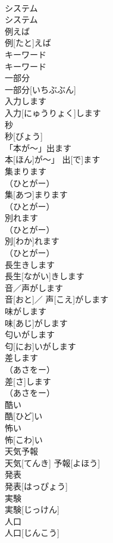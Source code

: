 \documentclass[8pt]{extreport}
\begin{document}
\begin{CJK}{UTF8}{min}
\\	システム	
\\	システム	
\\	例えば	
\\	例[たと]えば	
\\	キーワード	
\\	キーワード	
\\	一部分	
\\	一部分[いちぶぶん]	
\\	入力します	
\\	入力[にゅうりょく]します	
\\	秒	
\\	秒[びょう]	
\\	「本が〜」出ます	
\\	本[ほん]が〜」 出[で]ます	
\\	集まります
\\	（ひとがー）
\\	集[あつ]まります
\\	（ひとがー）
\\	別れます
\\	（ひとがー）
\\	別[わか]れます
\\	（ひとがー）
\\	長生きします	
\\	長生[ながい]きします	
\\	音／声がします	
\\	音[おと]／ 声[こえ]がします	
\\	味がします	
\\	味[あじ]がします	
\\	匂いがします	
\\	匂[にお]いがします	
\\	差します
\\	（あさをー）
\\	差[さ]します
\\	（あさをー）
\\	酷い	
\\	酷[ひど]い	
\\	怖い	
\\	怖[こわ]い	
\\	天気予報	
\\	天気[てんき] 予報[よほう]	
\\	発表	
\\	発表[はっぴょう]	
\\	実験	
\\	実験[じっけん]	
\\	人口	
\\	人口[じんこう]	

\end{CJK}
\end{document}
